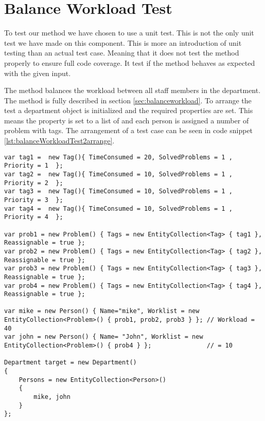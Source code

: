 \chapter{Balance Workload Test}
\label{sec:balWorUniTes}

To test our  method we have chosen to use a unit test. This is not the only unit test we have made on this component. This is more an introduction of unit testing than an actual test case. Meaning that it does not test the method properly to ensure full code coverage. It test if the method behaves as expected with the given input. 

The  method balances the workload between all staff members in the department. 
The method is fully described in section \ref{sec:balanceworkload}. 
To arrange the test a department object is initialized and the required properties are set. This means the  property is set to a list of  and each person is assigned a number of problem with tags. 
The arrangement of a test case can be seen in code snippet \ref{lst:balanceWorkloadTest2arrange}. 

\begin{lstlisting}[style=sourceCode, caption=\myCaption{The arrange phase of the unit test of balance workload}, label=lst:balanceWorkloadTest2arrange,name=src:balance]
var tag1 =  new Tag(){ TimeConsumed = 20, SolvedProblems = 1 , Priority = 1  };  
var tag2 =  new Tag(){ TimeConsumed = 10, SolvedProblems = 1 , Priority = 2  }; 
var tag3 =  new Tag(){ TimeConsumed = 10, SolvedProblems = 1 , Priority = 3  }; 
var tag4 =  new Tag(){ TimeConsumed = 10, SolvedProblems = 1 , Priority = 4  }; 

var prob1 = new Problem() { Tags = new EntityCollection<Tag> { tag1 }, Reassignable = true };
var prob2 = new Problem() { Tags = new EntityCollection<Tag> { tag2 }, Reassignable = true };
var prob3 = new Problem() { Tags = new EntityCollection<Tag> { tag3 }, Reassignable = true };
var prob4 = new Problem() { Tags = new EntityCollection<Tag> { tag4 }, Reassignable = true };
   
var mike = new Person() { Name="mike", Worklist = new EntityCollection<Problem>() { prob1, prob2, prob3 } }; // Workload = 40
var john = new Person() { Name= "John", Worklist = new EntityCollection<Problem>() { prob4 } };               // = 10

Department target = new Department()
{
    Persons = new EntityCollection<Person>()
    {
        mike, john
    }
};
\end{lstlisting}

